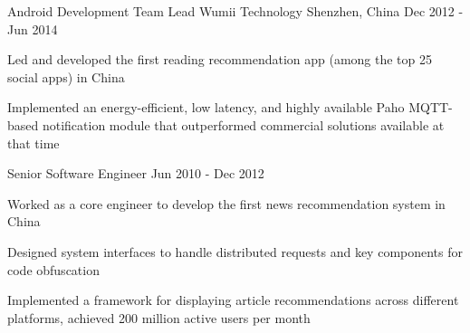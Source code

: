 \begin{cventries}
  \cventry
    {Android Development Team Lead} %
    {Wumii Technology} %
    {Shenzhen, China} %
    {Dec 2012 - Jun 2014} %
    {
      \begin{cvitems} %
        \item {Led and developed the first reading recommendation app (among the top 25 social apps) in China}
        \item {Implemented an energy-efficient, low latency, and highly available Paho MQTT-based notification module that outperformed commercial solutions available at that time}
      \end{cvitems}
    }

  \cventry
    {Senior Software Engineer}
    {} %
    {} %
    {Jun 2010 - Dec 2012} %
    {
      \begin{cvitems} %
        \item {Worked as a core engineer to develop the first news recommendation system in China}
        \item {Designed system interfaces to handle distributed requests and key components for code obfuscation}
        \item{Implemented a framework for displaying article recommendations across different platforms, achieved 200 million active users per month}
      \end{cvitems}
    }

\end{cventries}
